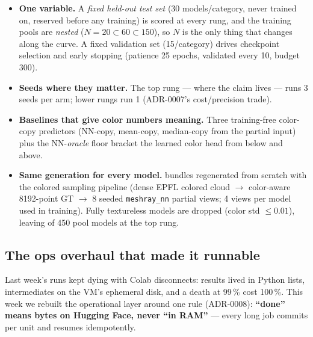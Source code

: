 \documentclass[11pt]{article}
\begin{document}
\begin{itemize}
  \item \textbf{One variable.} A \emph{fixed held-out test set} (30 models/category,
  never trained on, reserved before any training) is scored at every rung, and the
  training pools are \emph{nested} ($N{=}20 \subset 60 \subset 150$), so $N$ is the only
  thing that changes along the curve. A fixed validation set (15/category) drives
  checkpoint selection and early stopping (patience 25 epochs, validated every 10, budget
  300).
  \item \textbf{Seeds where they matter.} The top rung --- where the claim lives --- runs
  3 seeds per arm; lower rungs run 1 (ADR-0007's cost/precision trade).
  \item \textbf{Baselines that give color numbers meaning.} Three training-free
  color-copy predictors (NN-copy, mean-copy, median-copy from the partial input) plus the
  NN-\emph{oracle} floor bracket the learned color head from below and above.
  \item \textbf{Same generation for every model.} \nBundles{} bundles regenerated from
  scratch with the colored sampling pipeline (dense EPFL colored cloud
  $\rightarrow$ color-aware 8192-point GT $\rightarrow$ 8 seeded \texttt{meshray\_nn}
  partial views; 4 views per model used in training). Fully textureless models are
  dropped (color std $\le 0.01$), leaving \nTrainTop{} of 450 pool models at the top
  rung.
\end{itemize}

\subsection{The ops overhaul that made it runnable}\label{sec:ops}

Last week's runs kept dying with Colab disconnects: results lived in Python lists,
intermediates on the VM's ephemeral disk, and a death at 99\,\% cost 100\,\%. This week
we rebuilt the operational layer around one rule (ADR-0008): \textbf{``done'' means bytes
on Hugging Face, never ``in RAM''} --- every long job commits per unit and resumes
idempotently.
\end{document}
